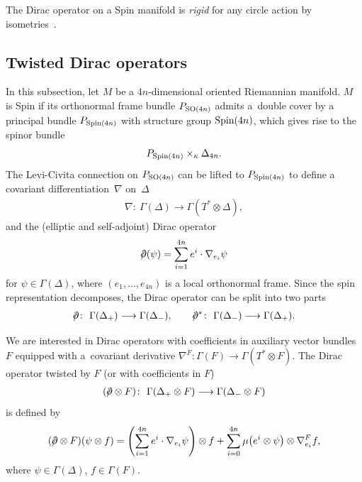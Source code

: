 \documentclass[pdftex]{sigma}
\newcommand{\dirac}{/\kern-5pt\partial}
\numberwithin{equation}{section}
\begin{document}
\begin{Example} The Dirac operator on a Spin manifold is {\em rigid} for any circle action by iso\-met\-ries~\cite{AH}.
\end{Example}

\subsection{Twisted Dirac operators}

In this subsection, let $M$ be a $4n$-dimensional oriented Riemannian manifold. $M$ is Spin if its orthonormal frame bundle $P_{{\rm SO}(4n)}$ admits a~double cover by a principal bundle $P_{{\rm Spin}(4n)}$ with structure group ${\rm Spin}(4n)$, which gives rise to the spinor bundle
\begin{gather*}P_{{\rm Spin}(4n)}\times_{\kappa}\Delta_{4n}. \end{gather*}
The Levi-Civita connection on $P_{{\rm SO}(4n)}$ can be lifted to $P_{{\rm Spin}(4n)}$ to def\/ine a covariant dif\/ferentia\-tion~$\nabla$ on~$\Delta$
\begin{gather*}\nabla\colon \ \Gamma (\Delta ) \longrightarrow \Gamma (T^*\otimes \Delta),\end{gather*}
and the (elliptic and self-adjoint) Dirac operator
\begin{gather*}\dirac (\psi) = \sum_{i=1}^{4n} e^i\cdot \nabla_{e_i}\psi\end{gather*}
for $\psi\in\Gamma(\Delta)$, where $(e_1,\dots, e_{4n})$ is a local orthonormal frame. Since the spin representation decomposes, the Dirac operator can be split into two parts
\begin{gather*}\dirac\colon \ \Gamma (\Delta_+ ) \longrightarrow \Gamma ( \Delta_-),\qquad
\dirac^*\colon \ \Gamma (\Delta_- ) \longrightarrow \Gamma ( \Delta_+).\end{gather*}

We are interested in Dirac operators with coef\/f\/icients in auxiliary vector bundles $F$ equipped with a~covariant derivative $\nabla^F\colon \Gamma(F)\longrightarrow\Gamma(T^*\otimes F)$. The Dirac operator twisted by $F$ (or with coef\/f\/icients
in $F$)
\begin{gather*}(\dirac\otimes F)\colon \ \Gamma (\Delta_+\otimes F) \longrightarrow \Gamma (\Delta_-\otimes F)\end{gather*}
is def\/ined by
\begin{gather*}(\dirac\otimes F) (\psi\otimes f) = \left(\sum_{i=1}^{4n} e^i\cdot \nabla_{e_i}\psi\right)\otimes f + \sum_{i=0}^{4n}
\mu\big(e^i\otimes \psi\big) \otimes \nabla_{e_i}^F f,\end{gather*}
where $\psi\in\Gamma(\Delta)$, $f\in\Gamma(F)$.
\end{document}
